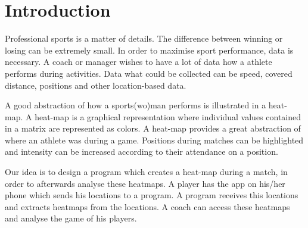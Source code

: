 \section{Introduction}
Professional sports is a matter of details. The difference between winning or losing can be extremely small. In order to maximise sport performance, data is necessary. A coach or manager wishes to have a lot of data how a athlete performs during activities. Data what could be collected can be speed, covered distance, positions and other location-based data.

A good abstraction of how a sports(wo)man performs is illustrated in a heat-map. A heat-map is a graphical representation where individual values contained in a matrix are represented as colors. A heat-map provides a great abstraction of where an athlete was during a game. Positions during matches can be highlighted and intensity can be increased according to their attendance on a position.

Our idea is to design a program which creates a heat-map during a match, in order to afterwards analyse these heatmaps. A player has the app on his/her phone which sends his locations to a program. A program receives this locations and extracts heatmaps from the locations. A coach can access these heatmaps and analyse the game of his players.